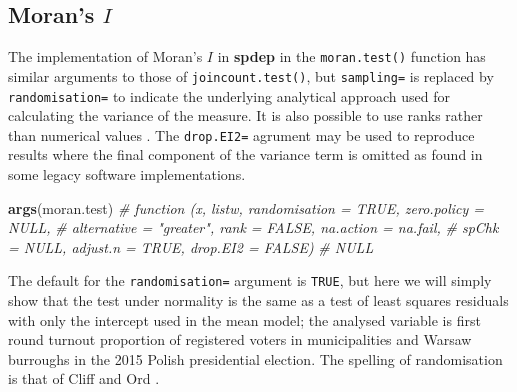 \documentclass[]{book}
\newenvironment{Shaded}{\begin{snugshade}}{\end{snugshade}}
\newcommand{\CommentTok}[1]{\textcolor[rgb]{0.56,0.35,0.01}{\textit{#1}}}
\newcommand{\DataTypeTok}[1]{\textcolor[rgb]{0.13,0.29,0.53}{#1}}
\newcommand{\KeywordTok}[1]{\textcolor[rgb]{0.13,0.29,0.53}{\textbf{#1}}}
\newcommand{\NormalTok}[1]{#1}
\newcommand{\OperatorTok}[1]{\textcolor[rgb]{0.81,0.36,0.00}{\textbf{#1}}}
\newcommand{\OtherTok}[1]{\textcolor[rgb]{0.56,0.35,0.01}{#1}}
\newcommand{\StringTok}[1]{\textcolor[rgb]{0.31,0.60,0.02}{#1}}
\begin{document}
\hypertarget{morans-i}{%
\subsection{\texorpdfstring{Moran's \(I\)}{Moran's I}}\label{morans-i}}

The implementation of Moran's \(I\) in \textbf{spdep} in the \texttt{moran.test()} function has similar arguments to those of \texttt{joincount.test()}, but \texttt{sampling=} is replaced by \texttt{randomisation=} to indicate the underlying analytical approach used for calculating the variance of the measure. It is also possible to use ranks rather than numerical values \citep[p.~46]{cliff+ord:81}. The \texttt{drop.EI2=} agrument may be used to reproduce results where the final component of the variance term is omitted as found in some legacy software implementations.

\begin{Shaded}
\begin{Highlighting}[]
\KeywordTok{args}\NormalTok{(moran.test)}
\CommentTok{# function (x, listw, randomisation = TRUE, zero.policy = NULL, }
\CommentTok{#     alternative = "greater", rank = FALSE, na.action = na.fail, }
\CommentTok{#     spChk = NULL, adjust.n = TRUE, drop.EI2 = FALSE) }
\CommentTok{# NULL}
\end{Highlighting}
\end{Shaded}

The default for the \texttt{randomisation=} argument is \texttt{TRUE}, but here we will simply show that the test under normality is the same as a test of least squares residuals with only the intercept used in the mean model; the analysed variable is first round turnout proportion of registered voters in municipalities and Warsaw burroughs in the 2015 Polish presidential election. The spelling of randomisation is that of Cliff and Ord \citeyearpar{cliff+ord:73}.

\begin{Shaded}
\end{Shaded}
\end{document}
